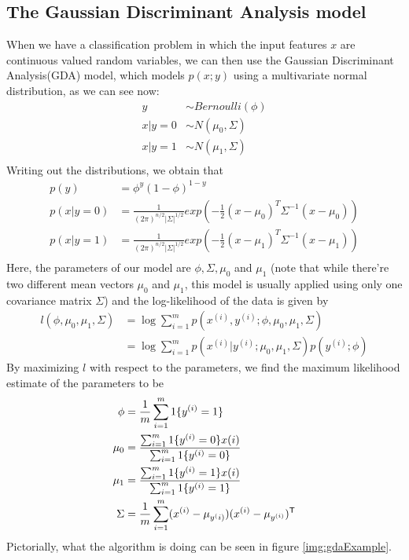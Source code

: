 \subsection{The Gaussian Discriminant Analysis model}
When we have a classification problem in which the input features $x$ are continuous valued random variables,
we can then use the Gaussian Discriminant Analysis(GDA) model, which models $p(x; y)$ using a
multivariate normal distribution, as we can see now:
\begin{align*}
    y & \sim Bernoulli(\phi) \\
    x|y = 0 & \sim  N(\mu_0, \Sigma) \\
    x|y = 1 & \sim  N(\mu_1, \Sigma) \\
\end{align*}
Writing out the distributions, we obtain that 
\begin{align*}
    p(y) & = \phi^y (1 - \phi)^{1-y} \\
    p(x| y = 0) & = \frac{1}{(2\pi)^{n/2} |\Sigma|^{1/2}} exp(-\frac{1}{2}(x - \mu_0)^T \Sigma^{-1} (x - \mu_0)) \\
    p(x| y = 1) & = \frac{1}{(2\pi)^{n/2} |\Sigma|^{1/2}} exp(-\frac{1}{2}(x - \mu_1)^T \Sigma^{-1} (x - \mu_1)) \\    
\end{align*}
Here, the parameters of our model are $\phi, \Sigma, \mu_0$ and $\mu_1$ (note that while there’re 
two different mean vectors $\mu_0$ and $\mu_1$, this model is usually applied using only 
one covariance matrix $\Sigma$) and the log-likelihood of the data is given by 
\begin{align*}
    l(\phi, \mu_0, \mu_1, \Sigma) & = \log \sum _{i=1}^m p(x^{(i)}, y^{(i)}; \phi, \mu_0, \mu_1, \Sigma) \\
                                  & = \log \sum _{i=1}^m p(x^{(i)} | y^{(i)}; \mu_0, \mu_1, \Sigma) p(y^{(i)}; \phi) 
\end{align*}
By maximizing $l$ with respect to the parameters, we find the maximum likelihood estimate of the parameters to be
\begin{align*}
    \phi & = \frac{1}{m} \sum _{i=1} ^ m 1\{y^{(i)} = 1 \} \\
    \mu_0 & = \frac{\sum _{i=1} ^ m 1\{y^{(i)} = 0\}x(i)}{\sum _{i=1} ^ m 1\{y^{(i)} = 0\}} \\
    \mu_1 & = \frac{\sum _{i=1} ^ m 1\{y^{(i)} = 1\}x(i)}{\sum _{i=1} ^ m 1\{y^{(i)} = 1\}}\\    
    \Sigma & = \frac{1}{m} \sum _{i=1}^m (x^{(i)} - \mu _{y^(i)}) (x^{(i)} - \mu _{y^{(i)}}) ^ \mathsf{T}
\end{align*}
Pictorially, what the algorithm is doing can be seen in figure \ref{img:gdaExample}.

